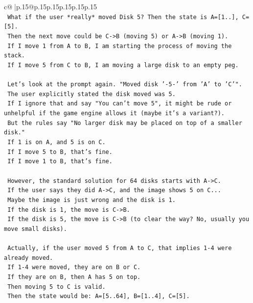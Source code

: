 \documentclass{article}
\begin{document}
{\begin{supertabular}{c@{$\;$}|p{.15\linewidth}@{}p{.15\linewidth}p{.15\linewidth}p{.15\linewidth}p{.15\linewidth}p{.15\linewidth}}
{{{\\ 
\texttt{    What if the user *really* moved Disk 5? Then the state is A={[}1..{]}, C={[}5{]}.} \\
\texttt{    Then the next move could be C{-}>B (moving 5) or A{-}>B (moving 1).} \\
\texttt{    If I move 1 from A to B, I am starting the process of moving the stack.} \\
\texttt{    If I move 5 from C to B, I am moving a large disk to an empty peg.} \\
\\ 
\texttt{    Let's look at the prompt again. "Moved disk '{-}5{-}' from 'A' to 'C'".} \\
\texttt{    The user explicitly stated the disk moved was 5.} \\
\texttt{    If I ignore that and say "You can't move 5", it might be rude or unhelpful if the game engine allows it (maybe it's a variant?).} \\
\texttt{    But the rules say "No larger disk may be placed on top of a smaller disk."} \\
\texttt{    If 1 is on A, and 5 is on C.} \\
\texttt{    If I move 5 to B, that's fine.} \\
\texttt{    If I move 1 to B, that's fine.} \\
\\ 
\texttt{    However, the standard solution for 64 disks starts with A{-}>C.} \\
\texttt{    If the user says they did A{-}>C, and the image shows 5 on C...} \\
\texttt{    Maybe the image is just wrong and the disk is 1.} \\
\texttt{    If the disk is 1, the move is C{-}>B.} \\
\texttt{    If the disk is 5, the move is C{-}>B (to clear the way? No, usually you move small disks).} \\
\\ 
\texttt{    Actually, if the user moved 5 from A to C, that implies 1{-}4 were already moved.} \\
\texttt{    If 1{-}4 were moved, they are on B or C.} \\
\texttt{    If they are on B, then A has 5 on top.} \\
\texttt{    Then moving 5 to C is valid.} \\
\texttt{    Then the state would be: A={[}5..64{]}, B={[}1..4{]}, C={[}5{]}.} \\
}}}
\end{supertabular}}
\end{document}
